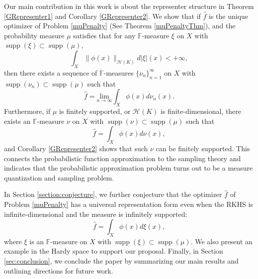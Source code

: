 \documentclass{amsart}
\numberwithin{equation}{section}
\DeclareMathOperator{\supp}{supp}
\theoremstyle{plain}
\theoremstyle{remark}
\theoremstyle{definition}
\begin{document}
Our main contribution in this work is about the representer structure in Theorem \ref{GRepresenter1} and Corollary \ref{GRepresenter2}. We show that
if $\hat{f}$ is the unique optimizer of Problem \ref{muPenalty} (See Theorem \ref{muPenaltyThm}), and the probability measure $\mu$ satisfies that for any $\mathbb{F}$-measure $\xi$ on $X$ with $\supp (\xi) \subset \supp (\mu)$, $$\int_X \|\phi(x)\|_{\mathscr{H}(K)}d|\xi|(x)<+\infty,$$
then there exists a sequence of $\mathbb{F}$-measures $\{\nu_n\}_{n=1}^{\infty}$ on $X$ with  $\supp(\nu_n) \subset \supp(\mu)$ such that 
\begin{equation*}
    \hat{f} = \underset{n \rightarrow \infty}{\text{lim}}\int_{X} \phi(x) d\nu_n(x).
\end{equation*} 
Furthermore, if $\mu$ is finitely supported, or $\mathscr{H}(K)$ is finite-dimensional, there exists an $\mathbb{F}$-measure $\nu$ on $X$ with  $\supp(\nu) \subset \supp(\mu)$ such that 
\begin{equation*}
    \hat{f} = \int_{X} \phi(x) d\nu(x),
\end{equation*} 
and Corollary \ref{GRepresenter2} shows that such $\nu$ can be finitely supported.
This connects the probabilistic function approximation to the sampling theory and indicates that the probabilistic approximation problem turns out to be a measure quantization and sampling problem. %

In Section \ref{section:conjecture}, we further conjecture that the optimizer $\hat{f}$ of Problem \ref{muPenalty} has a universal representation form even when the RKHS is infinite-dimensional and the measure is infinitely supported:
\begin{equation*}
    \hat{f} = \int_{X} \phi(x) d\xi(x),
\end{equation*} 
where $\xi$  is an $\mathbb{F}$-measure on $X$ with $\supp(\xi) \subset \supp(\mu)$. 
We also present an example in the Hardy space to support our proposal. Finally, in Section \ref{sec:conclusion}, we conclude the paper by summarizing our main results and outlining directions for future work.
\end{document}
